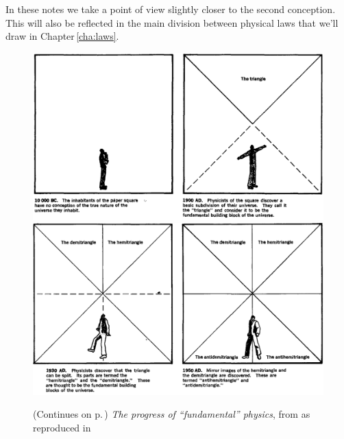 \documentclass[a4paper,12pt,%
onecolumn,oneside,titlepage,%
british%
]{memoir}
\renewcommand*{\|}[1][]{\nonscript\:#1\vert\nonscript\:\mathopen{}}
\newcommand*{\chap}{Chapter}%
\begin{document}
In these notes we take a point of view slightly closer to the second conception. This will also be reflected in the main division between physical laws that we'll draw in \chap\,\ref{cha:laws}.


\begin{figure}[p]
  \centering
  \includegraphics[width=1.2\textwidth]{images/chew1.png}
  \\[1em]  \includegraphics[width=1.2\textwidth]{images/chew2.png}
  \caption{(Continues on p.\,\pageref{fig:chew2}) \emph{The progress of \enquote{fundamental} physics}, from \cites{chew1970} as reproduced in \cites{truesdell1984_r1987}}
  \label{fig:chew1}
\end{figure}
\end{document}
